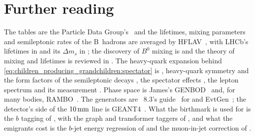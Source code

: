 \section{Further reading}
\label{sec:children_producing_grandchildren:further_reading}
The tables are the Particle Data Group's~\cite{ParticleDataGroup:2024cfk}
and the lifetimes, mixing parameters and semileptonic rates of the
B~hadrons are averaged by HFLAV~\cite{HeavyFlavorAveragingGroupHFLAV:2024ctg},
with LHCb's lifetimes in \cite{LHCb:2014qsd} and its $\Delta m_s$ in
\cite{LHCb:2021moh}; the discovery of $B^0$ mixing is
\cite{ARGUS:1987xtv} and the theory of mixing and lifetimes is reviewed in
\cite{Artuso:2015swg,Lenz:2014jha,Lenz:2022rbq}. The heavy-quark
expansion behind \cref{eq:children_producing_grandchildren:spectator} is
\cite{Bigi:1992su,Manohar:1993qn}, heavy-quark symmetry and the form
factors of the semileptonic decays
\cite{Isgur:1989vq,Neubert:1993mb,Caprini:1997mu,Boyd:1995sq}, the
spectator effects \cite{Neubert:1996we}, the lepton spectrum
\cite{Altarelli:1982kh} and its measurement \cite{BaBar:2004bij}. Phase
space is James's GENBOD~\cite{James:1968gu} and, for many bodies,
RAMBO~\cite{Kleiss:1985gy}. The generators are \PYTHIA~8.3's
guide~\cite{Bierlich:2022pfr} for  and
EvtGen~\cite{Lange:2001uf,Abudinen:2024wpc}; the detector's side of the
$10\,\mathrm{mm}$ line is GEANT4~\cite{GEANT4:2002zbu}. What the birthmark is used
for is the $b$ tagging of \cite{CMS:2012feb,CMS:2017wtu,Bols:2020bkb},
with the graph and transformer taggers of
\cite{Qu:2019gqs,Qu:2022mxj,ATLAS:2022rkn,ATLAS:2025dkv}, and what the
emigrants cost is the $b$-jet energy regression of \cite{CMS:2019uxx} and
the muon-in-jet correction of \cite{CMS:2018nsn}.

